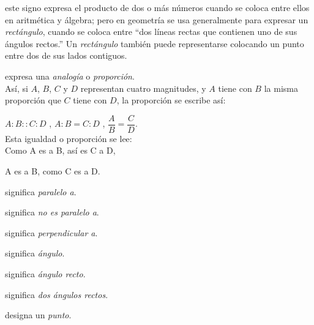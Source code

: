 \documentclass[booklanguage=english]{byrnebook}
\begin{document}
\symb{$\times$}
 este signo expresa el producto de dos o más números cuando se coloca entre ellos en aritmética y álgebra; pero en geometría se usa generalmente para expresar un \emph{rectángulo}, cuando se coloca entre \enquote{dos líneas rectas que contienen uno de sus ángulos rectos.} Un \emph{rectángulo} también puede representarse colocando un punto entre dos de sus lados contiguos.

\symb{$:\ ::\ :$}
 expresa una \emph{analogía} o \emph{proporción}. \\ Así, si $A$, $B$, $C$ y $D$ representan cuatro magnitudes, y $A$ tiene con $B$ la misma proporción que $C$ tiene con $D$, la proporción se escribe así:

$A : B :: C : D$ , $A : B = C : D$ , $\dfrac{A}{B} = \dfrac{C}{D}$. \\

Esta igualdad o proporción se lee:\\

Como A es a B, así es C a D,

A es a B, como C es a D.

\pagebreak

\symb{$\parallel$}
 significa \emph{paralelo a}.

\symb{$\nparallel$}
 significa \emph{no es paralelo a}.

\symb{$\perp$}
 significa \emph{perpendicular a}.



 significa \emph{ángulo}.

 significa \emph{ángulo recto}.

\symb{\drawTwoRightAngles}
 significa \emph{dos ángulos rectos}.


designa un \emph{punto}.
\end{document}
